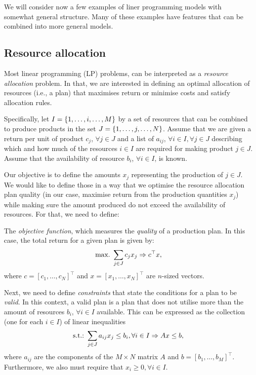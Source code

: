 We will consider now a few examples of liner programming models with somewhat general structure. Many of these examples have features that can be combined into more general models.


\subsection{Resource allocation}

Most linear programming (LP) problems, can be interpreted as a \emph{resource allocation} problem. In that, we are interested in defining an optimal allocation of resources (i.e., a plan) that maximises return or minimise costs and satisfy allocation rules. 

Specifically, let $I = \left\{ 1, \dots, i, \dots, M \right \}$ by a set of resources that can be combined to produce products in the set $J = \left\{ 1, \dots, j, \dots, N \right \}$. Assume that we are given a return per unit of product $c_j$, $\forall j\in J$ and a list of $a_{ij}$, $\forall i \in I, \forall j \in J$ describing which and how much of the resources $i \in I$ are required for making product $j \in J$. Assume that the availability of resource $b_i$, $\forall i\in I$, is known. 

Our objective is to define the amounts $x_j$ representing the production of $j \in J$. We would like to define those in a way that we optimise the resource allocation plan quality (in our case, maximise return from the production quantities $x_j$) while making sure the amount produced do not exceed the availability of resources. For that, we need to define: 

The \emph{objective function}, which measures the \emph{quality} of a production plan. In this case, the total return for a given plan is given by:
%
\begin{equation*}
	\mathop{\text{max.~}} \sum_{j \in J}c_jx_j \Rightarrow c^\top x,
\end{equation*}
%
where $c = [c_1, \dots, c_{N}]^\top$ and $x = [x_1, \dots, x_{N}]^\top$ are $n$-sized vectors.


Next, we need to define \emph{constraints} that state the conditions for a plan to be \emph{valid}. In this context, a valid plan is a plan that does not utilise more than the amount of resources $b_i$, $\forall i \in I$ available. This can be expressed as the collection (one for each $i \in I$) of linear inequalities
%
\begin{equation*}
	\mathop{\text{s.t.:~}} \sum_{j \in J} a_{ij}x_j \leq b_i, \forall i \in I	\Rightarrow	Ax \leq b,
\end{equation*}
%
where $a_{ij}$ are the components of the $M \times N$ matrix $A$ and $b = [b_1,\dots, b_M]^\top$. Furthermore, we also must require that $x_i \geq 0, \forall i \in I$.                                                                                                         

